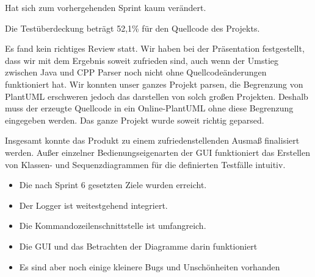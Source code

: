 \nsecend

Hat sich zum vorhergehenden Sprint kaum verändert.
\nsecend%

Die Testüberdeckung beträgt 52,1\% für den Quellcode des Projekts.
\nsecend%


Es fand kein richtiges Review statt. Wir haben bei der Präsentation festgestellt, dass wir mit dem Ergebnis soweit zufrieden sind, auch wenn der Umstieg zwischen Java und CPP Parser noch nicht ohne Quellcodeänderungen funktioniert hat. Wir konnten unser ganzes Projekt parsen, die Begrenzung von PlantUML erschweren jedoch das darstellen von solch großen Projekten. Deshalb muss der erzeugte Quellcode in ein Online-PlantUML ohne diese Begrenzung eingegeben werden. Das ganze Projekt wurde soweit richtig geparsed.

\nsecend%

Insgesamt konnte das Produkt zu einem zufriedenstellenden Ausmaß finalisiert werden. Außer einzelner Bedienungseigenarten der GUI funktioniert das Erstellen von Klassen- und Sequenzdiagrammen für die definierten Testfälle intuitiv.
\nsecend%

\begin{itemize}
\item Die nach Sprint 6 gesetzten Ziele wurden erreicht.
\item Der Logger ist weitestgehend integriert.
\item Die Kommandozeilenschnittstelle ist umfangreich.
\item Die GUI und das Betrachten der Diagramme darin funktioniert
\item Es sind aber noch einige kleinere Bugs und Unschönheiten vorhanden
\end{itemize}
\nsecend%